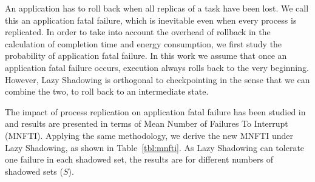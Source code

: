 An application has to roll back when all replicas of a task have been lost. We call this an application fatal failure, which is inevitable even when every process is replicated. 
In order to take into account the overhead of rollback in the calculation of completion time and energy consumption, we first 
study the probability of application fatal failure. In this work we assume that once an application fatal failure occurs, execution always rolls back to the very 
beginning. 
However, Lazy Shadowing is orthogonal to checkpointing in 
the sense that we can combine the two, to roll back to an intermediate state. 

The impact of process replication on application fatal failure has been studied in~\cite{casanova_inria_2012} and 
results are presented in terms of Mean Number of Failures To Interrupt (MNFTI). %
Applying the same methodology, we derive the new MNFTI
under Lazy Shadowing, %
as shown in Table~\ref{tbl:mnfti}. As Lazy Shadowing can tolerate one failure in each shadowed set, the results are 
for different numbers of shadowed sets ($S$). 
